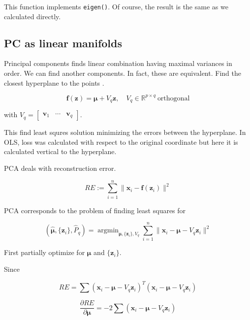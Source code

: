 \documentclass[]{book}
\DeclareMathOperator*{\argmin}{argmin}
\theoremstyle{definition}
\theoremstyle{definition}
\theoremstyle{definition}
\theoremstyle{remark}
\let\BeginKnitrBlock\begin \let\EndKnitrBlock\end
\begin{document}
This function implements \texttt{eigen()}. Of course, the result is the same as we calculated directly.

\hypertarget{pc-as-linear-manifolds}{%
\subsection{PC as linear manifolds}\label{pc-as-linear-manifolds}}

Principal components finds linear combination having maximal variances in order. We can find another components. In fact, these are equivalent. Find the closest hyperplane to the points \citep{Hastie:2013aa}.

\[\mathbf{f}(\mathbf{z}) = \boldsymbol\mu + V_q \mathbf{z}, \quad V_q \in \mathbb{R}^{p \times q} \: \text{orthogonal}\]

with \(V_q = \begin{bmatrix} \mathbf{v}_1 & \cdots & \mathbf{v}_q \end{bmatrix}\).

This find least squres solution minimizing the errors between the hyperplane. In OLS, loss was calculated with respect to the original coordinate but here it is calculated vertical to the hyperplane.

\BeginKnitrBlock{definition}[Reconstruction error]
\protect\hypertarget{def:re}{}{\label{def:re} {} }PCA deals with reconstruction error.

\[RE := \sum_{i = 1}^n \lVert \mathbf{x}_i - \mathbf{f}(\mathbf{z}_i) \rVert^2\]
\EndKnitrBlock{definition}

PCA corresponds to the problem of finding least squares for

\begin{equation}
  (\hat{\boldsymbol\mu}, \{ \mathbf{z}_i \}, \hat{P}_q) = \argmin_{\boldsymbol\mu, \{ \mathbf{z}_i \}, V_q} \sum_{i = 1}^n \lVert \mathbf{x}_i - \boldsymbol\mu - V_q \mathbf{z}_i \rVert^2
  \label{eq:pcare}
\end{equation}

First partially optimize for \(\boldsymbol\mu\) and \(\{ \mathbf{z}_i \}\).

Since

\[RE = \sum (\mathbf{x}_i - \boldsymbol\mu - V_q \mathbf{z}_i)^T (\mathbf{x}_i - \boldsymbol\mu - V_q \mathbf{z}_i)\]

\[\frac{\partial RE}{\partial \boldsymbol\mu} = -2 \sum (\mathbf{x}_i - \boldsymbol\mu - V_q \mathbf{z}_i)\]
\end{document}
